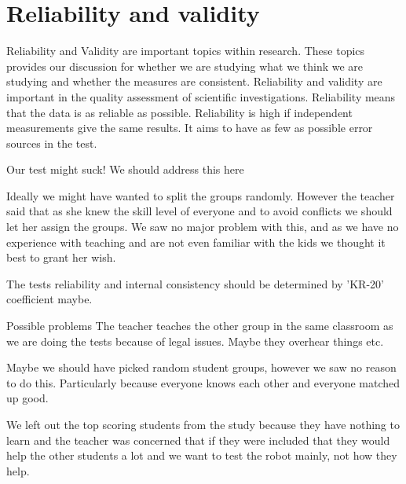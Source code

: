 \chapter{Reliability and validity}
Reliability and Validity are important topics within research. These topics provides our discussion for whether we are studying what we think we are studying and whether the measures are consistent. 
Reliability and validity are important in the quality assessment of scientific investigations. Reliability means that the data is as reliable as possible. Reliability is high if independent measurements give the same results. It aims to have as few as possible error sources in the test. 

Our test might suck! We should address this here

Ideally we might have wanted to split the groups randomly. However the teacher said that as she knew the skill level of everyone and to avoid conflicts we should let her assign the groups. We saw no major problem with this, and as we have no experience with teaching and are not even familiar with the kids we thought it best to grant her wish.

The tests reliability and internal consistency should be determined by 'KR-20' coefficient maybe. 

Possible problems
The teacher teaches the other group in the same classroom as we are doing the tests because of legal issues. Maybe they overhear things etc. 

Maybe we should have picked random student groups, however we saw no reason to do this. Particularly because everyone knows each other and everyone matched up good. 

We left out the top scoring students from the study because they have nothing to learn and the teacher was concerned that if they were included that they would help the other students a lot and we want to test the robot mainly, not how they help. 
